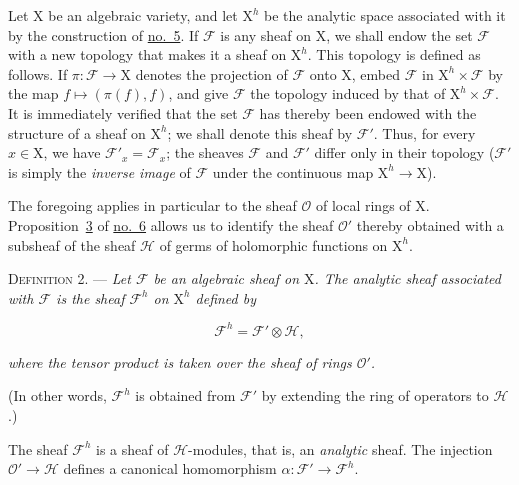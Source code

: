 

Let $\mathrm{X}$ be an algebraic variety, and let $\mathrm{X}^h$ be the analytic space associated with it by the construction of \hyperref[gaga:no:5]{no.~5}. If $\mathcal{F}$ is any sheaf on $\mathrm{X}$, we shall endow the set $\mathcal{F}$ with a new topology that makes it a sheaf on $\mathrm{X}^h$. This topology is defined as follows. If $\pi:\mathcal{F}\to\mathrm{X}$ denotes the projection of $\mathcal{F}$ onto $\mathrm{X}$, embed $\mathcal{F}$ in $\mathrm{X}^h\times\mathcal{F}$ by the map $f\mapsto(\pi(f),f)$, and give $\mathcal{F}$ the topology induced by that of $\mathrm{X}^h\times\mathcal{F}$. It is immediately verified that the set $\mathcal{F}$ has thereby been endowed with the structure of a sheaf on $\mathrm{X}^h$; we shall denote this sheaf by $\mathcal{F}'$. Thus, for every $x\in\mathrm{X}$, we have $\mathcal{F}'_x=\mathcal{F}_x$; the sheaves $\mathcal{F}$ and $\mathcal{F}'$ differ only in their topology ($\mathcal{F}'$ is simply the \emph{inverse image} of $\mathcal{F}$ under the continuous map $\mathrm{X}^h\to\mathrm{X}$).

The foregoing applies in particular to the sheaf $\mathcal{O}$ of local rings of $\mathrm{X}$. Proposition~\hyperref[gaga:prop:3]{3} of \hyperref[gaga:no:6]{no.~6} allows us to identify the sheaf $\mathcal{O}'$ thereby obtained with a subsheaf of the sheaf $\mathcal{H}$ of germs of holomorphic functions on $\mathrm{X}^h$.

\textsc{Definition 2}. --- \emph{Let $\mathcal{F}$ be an algebraic sheaf on $\mathrm{X}$. The analytic sheaf associated with $\mathcal{F}$ is the sheaf $\mathcal{F}^h$ on $\mathrm{X}^h$ defined by}

\begin{equation*}
\mathcal{F}^h=\mathcal{F}'\otimes\mathcal{H},
\end{equation*}

\emph{where the tensor product is taken over the sheaf of rings $\mathcal{O}'$.}

(In other words, $\mathcal{F}^h$ is obtained from $\mathcal{F}'$ by extending the ring of operators to $\mathcal{H}$.)

The sheaf $\mathcal{F}^h$ is a sheaf of $\mathcal{H}$-modules, that is, an \emph{analytic} sheaf. The injection $\mathcal{O}'\to\mathcal{H}$ defines a canonical homomorphism $\alpha:\mathcal{F}'\to\mathcal{F}^h$.

